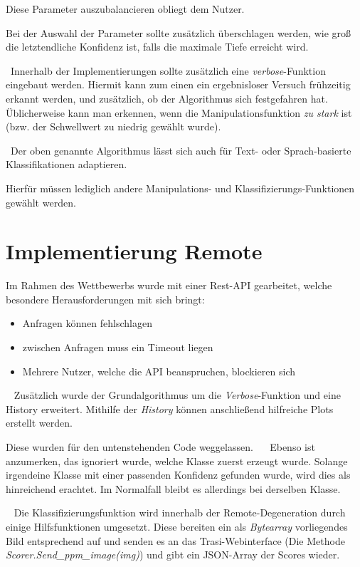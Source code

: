 Diese Parameter auszubalancieren obliegt dem Nutzer. 

Bei der Auswahl der Parameter sollte zusätzlich überschlagen werden, wie groß die letztendliche Konfidenz ist, falls die maximale Tiefe erreicht wird. 

~\newline Innerhalb der Implementierungen sollte zusätzlich eine \textit{verbose}-Funktion eingebaut werden. Hiermit kann zum einen ein ergebnisloser Versuch frühzeitig erkannt werden, und zusätzlich, ob der Algorithmus sich festgefahren hat. Üblicherweise kann man erkennen, wenn die Manipulationsfunktion \textit{zu stark} ist (bzw. der Schwellwert zu niedrig gewählt wurde).

~\newline Der oben genannte Algorithmus lässt sich auch für Text- oder Sprach-basierte Klassifikationen adaptieren. 

Hierfür müssen lediglich andere Manipulations- und Klassifizierungs-Funktionen gewählt werden.
\newpage
\section{Implementierung Remote}
\label{sec:DegenerationRemote}
Im Rahmen des Wettbewerbs wurde mit einer Rest-API  gearbeitet, welche besondere Herausforderungen mit sich bringt: 

\begin{itemize}
	\item Anfragen können fehlschlagen
	\item zwischen Anfragen muss ein Timeout liegen
	\item Mehrere Nutzer, welche die API beanspruchen, blockieren sich
\end{itemize}
~\newline
Zusätzlich wurde der Grundalgorithmus um die \textit{Verbose}-Funktion und eine History erweitert. Mithilfe der \textit{History} können anschließend hilfreiche Plots erstellt werden. 

Diese wurden für den untenstehenden Code weggelassen.
~\newline~\newline
Ebenso ist anzumerken, das ignoriert wurde, welche Klasse zuerst erzeugt wurde. Solange irgendeine Klasse mit einer passenden Konfidenz gefunden wurde, wird dies als hinreichend erachtet. Im Normalfall bleibt es allerdings bei derselben Klasse. 

~\newline 
Die Klassifizierungsfunktion wird innerhalb der Remote-Degeneration durch einige Hilfsfunktionen umgesetzt. Diese bereiten ein als \textit{Bytearray} vorliegendes Bild entsprechend auf und senden es an das Trasi-Webinterface (Die Methode \textit{Scorer.Send\_ppm\_image(img)}) und gibt ein JSON-Array der Scores wieder. 


